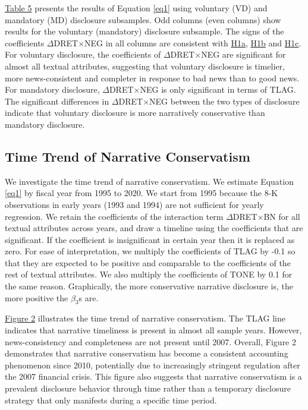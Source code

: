 \documentclass[letterpaper,12pt]{article}
\begin{document}
\begin{spacing}{1.5}
\hyperref[T5]{Table 5} presents the results of Equation \eqref{eq1} using voluntary (VD) and mandatory (MD) disclosure subsamples. Odd columns (even columns) show results for the voluntary (mandatory) disclosure subsample. The signs of the coefficients $\Delta$DRET$\times$NEG in all columns are consistent with \hyperref[hyp:h1a]{H1a}, \hyperref[hyp:h1b]{H1b} and \hyperref[hyp:h1c]{H1c}. For voluntary disclosure, the coefficients of $\Delta$DRET$\times$NEG are significant for almost all textual attributes, suggesting that voluntary disclosure is timelier, more news-consistent and completer in response to bad news than to good news. For mandatory disclosure, $\Delta$DRET$\times$NEG is only significant in terms of TLAG. The significant differences in $\Delta$DRET$\times$NEG between the two types of disclosure indicate that voluntary disclosure is more narratively conservative than mandatory disclosure.

\subsection{Time Trend of Narrative Conservatism}
\noindent We investigate the time trend of narrative conservatism. We estimate Equation \eqref{eq1} by fiscal year from 1995 to 2020. We start from 1995 because the 8-K observations in early years (1993 and 1994) are not sufficient for yearly regression. We retain the coefficients of the interaction term $\Delta$DRET$\times$BN for all textual attributes across years, and draw a timeline using the coefficients that are significant. If the coefficient is insignificant in certain year then it is replaced as zero. For ease of interpretation, we multiply the coefficients of TLAG by -0.1 so that they are expected to be positive and comparable to the coefficients of the rest of textual attributes. We also multiply the coefficients of TONE by 0.1 for the same reason. Graphically, the more conservative narrative disclosure is, the more positive the $\beta_3$s are.

\hyperref[fig2]{Figure 2} illustrates the time trend of narrative conservatism. The TLAG line indicates that narrative timeliness is present in almost all sample years. However, news-consistency and completeness are not present until 2007. Overall, Figure 2 demonstrates that narrative conservatism has become a consistent accounting phenomenon since 2010, potentially due to increasingly stringent regulation after the 2007 financial crisis. This figure also suggests that narrative conservatism is a prevalent disclosure behavior through time rather than a temporary disclosure strategy that only manifests during a specific time period.


\end{spacing}
\end{document}
